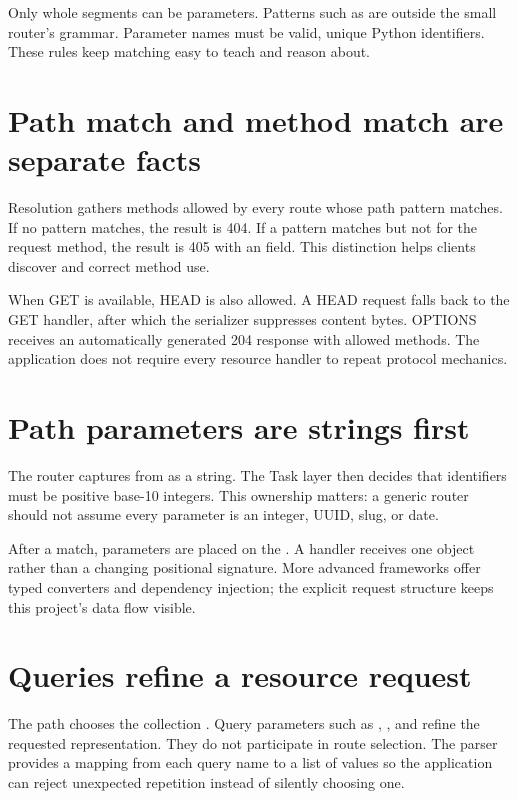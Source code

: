 Only whole segments can be parameters. Patterns such as
 are outside the small router's grammar. Parameter
names must be valid, unique Python identifiers. These rules keep matching easy
to teach and reason about.


\section{Path match and method match are separate facts}

Resolution gathers methods allowed by every route whose path pattern matches.
If no pattern matches, the result is 404. If a pattern matches but not for the
request method, the result is 405 with an  field. This distinction
helps clients discover and correct method use.

When GET is available, HEAD is also allowed. A HEAD request falls back to the GET
handler, after which the serializer suppresses content bytes. OPTIONS receives
an automatically generated 204 response with allowed methods. The application
does not require every resource handler to repeat protocol mechanics.

\section{Path parameters are strings first}

The router captures  from  as a string. The Task layer
then decides that identifiers must be positive base-10 integers. This ownership
matters: a generic router should not assume every parameter is an integer, UUID,
slug, or date.

After a match, parameters are placed on the . A handler receives
one object rather than a changing positional signature. More advanced frameworks
offer typed converters and dependency injection; the explicit request structure
keeps this project's data flow visible.

\section{Queries refine a resource request}

The path chooses the collection . Query parameters such as
, , and  refine the requested
representation. They do not participate in route selection. The parser provides
a mapping from each query name to a list of values so the application can reject
unexpected repetition instead of silently choosing one.


